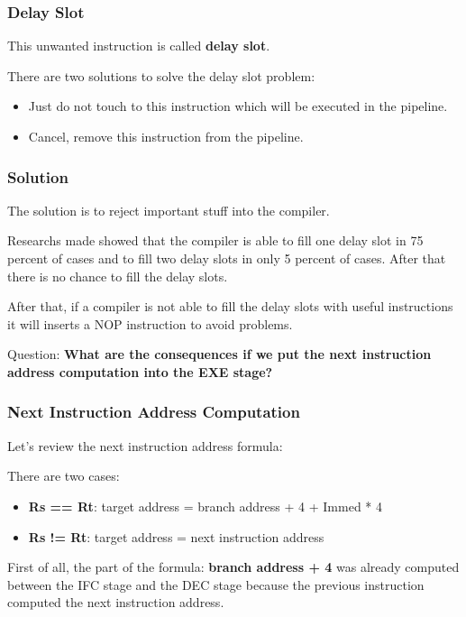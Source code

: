 
\begin{frame}
  \frametitle{Delay Slot}

  This unwanted instruction is called \textbf{delay slot}.

  \nl

  There are two solutions to solve the delay slot problem:

  \begin{itemize}[<+->]
    \item
      Just do not touch to this instruction which will be executed
      in the pipeline.
    \item
      Cancel, remove this instruction from the pipeline.
  \end{itemize}
\end{frame}


\begin{frame}
  \frametitle{Solution}

  The solution is to reject important stuff into the compiler.

  \nl

  Researchs made showed that the compiler is able to fill one delay
  slot in 75 percent of cases and to fill two delay slots in only
  5 percent of cases. After that there is no chance to fill the delay
  slots.

  \nl

  After that, if a compiler is not able to fill the delay slots
  with useful instructions it will inserts a NOP instruction to avoid
  problems.

  \nl

  Question: \textbf{What are the consequences if we put the next
    instruction address computation into the EXE stage?}
\end{frame}


\begin{frame}
  \frametitle{Next Instruction Address Computation}

  Let's review the next instruction address formula:

  \nl

  There are two cases:

  \begin{itemize}[<+->]
    \item
      \textbf{Rs == Rt}: target address = branch address + 4 + Immed * 4
    \item
      \textbf{Rs != Rt}: target address = next instruction address
  \end{itemize}

  \nl

  First of all, the part of the formula: \textbf{branch address + 4}
  was already computed between the IFC stage and the DEC stage because
  the previous instruction computed the next instruction address.
\end{frame}

